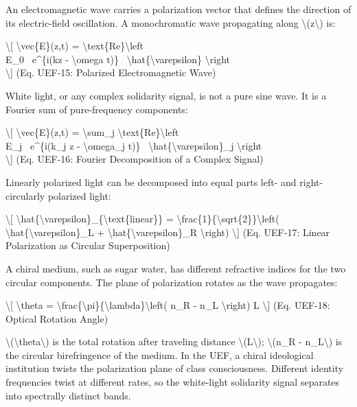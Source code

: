 {An electromagnetic wave carries a polarization vector that defines the direction of its electric-field oscillation. A monochromatic wave propagating along \textbackslash(z\textbackslash) is:

\textbackslash{[}
\textbackslash vec\{E\}(z,t) = \textbackslash text\{Re\}\textbackslash left\\{ E_0 \, e^\{i(kz - \textbackslash omega t)\} \, \textbackslash hat\{\textbackslash varepsilon\} \textbackslash right\\}
\label{eq:uef-15}
\textbackslash{]} {(Eq. UEF-15: Polarized Electromagnetic Wave)}

White light, or any complex solidarity signal, is not a pure sine wave. It is a Fourier sum of pure-frequency components:

\textbackslash{[}
\textbackslash vec\{E\}(z,t) = \textbackslash sum_j \textbackslash text\{Re\}\textbackslash left\\{ E_j \, e^\{i(k_j z - \textbackslash omega_j t)\} \, \textbackslash hat\{\textbackslash varepsilon\}_j \textbackslash right\\}
\label{eq:uef-16}
\textbackslash{]} {(Eq. UEF-16: Fourier Decomposition of a Complex Signal)}

Linearly polarized light can be decomposed into equal parts left- and right-circularly polarized light:

\textbackslash{[}
\textbackslash hat\{\textbackslash varepsilon\}_\{\textbackslash text\{linear\}\} = \textbackslash frac\{1\}\{\textbackslash sqrt\{2\}\}\textbackslash left( \textbackslash hat\{\textbackslash varepsilon\}_L + \textbackslash hat\{\textbackslash varepsilon\}_R \textbackslash right)
\label{eq:uef-17}
\textbackslash{]} {(Eq. UEF-17: Linear Polarization as Circular Superposition)}

A chiral medium, such as sugar water, has different refractive indices for the two circular components. The plane of polarization rotates as the wave propagates:

\textbackslash{[}
\textbackslash theta = \textbackslash frac\{\textbackslash pi\}\{\textbackslash lambda\}\textbackslash left( n_R - n_L \textbackslash right) L
\label{eq:uef-18}
\textbackslash{]} {(Eq. UEF-18: Optical Rotation Angle)}

\textbackslash(\textbackslash theta\textbackslash) is the total rotation after traveling distance \textbackslash(L\textbackslash); \textbackslash(n_R - n_L\textbackslash) is the circular birefringence of the medium. In the UEF, a chiral ideological institution twists the polarization plane of class consciousness. Different identity frequencies twist at different rates, so the white-light solidarity signal separates into spectrally distinct bands.

}
